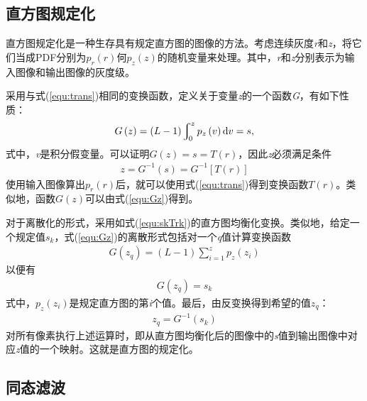 \documentclass{hitreport}
\begin{document}
\subsection{直方图规定化}\label{sec:guidinghua}

直方图规定化是一种生存具有规定直方图的图像的方法。考虑连续灰度\textit{r}和\textit{z}，将它们当成PDF分别为$p_r\left(r\right)$何$p_z\left(z\right)$的随机变量来处理。其中，\textit{r}和\textit{z}分别表示为输入图像和输出图像的灰度级。

采用与式(\ref{equ:trans})相同的变换函数，定义关于变量\textit{z}的一个函数\textit{G}，有如下性质：
\begin{align}\label{equ:Gz}
G\left(z\right) = \left(L-1\right)\varint\nolimits_{0}^{z}p_z\left(v\right)\mathrm{d}v = s,
\end{align}
式中，\textit{v}是积分假变量。可以证明$G\left(z\right) = s = T\left(r\right)$，因此\textit{z}必须满足条件
\begin{align}
z = G^{-1}\left(s\right) = G^{-1}\left[T\left(r\right)\right]
\end{align}
使用输入图像算出$p_r\left(r\right)$后，就可以使用式(\ref{equ:trans})得到变换函数$T\left(r\right)$。类似地，函数$G\left(z\right)$可以由式(\ref{equ:Gz})得到。

对于离散化的形式，采用如式(\ref{equ:skTrk})的直方图均衡化变换。类似地，给定一个规定值$s_k$，式(\ref{equ:Gz})的离散形式包括对一个\textit{q}值计算变换函数
\begin{align}
G\left(z_q\right) = \left(L-1\right)\sum_{i=1}^{z}p_z\left(z_i\right)
\end{align}
以便有
\begin{align}
G\left(z_q\right) = s_k
\end{align}
式中，$p_z\left(z_i\right)$是规定直方图的第\textit{i}个值。最后，由反变换得到希望的值$z_q$：
\begin{align}
z_q = G^{-1}\left(s_k\right)
\end{align}
对所有像素执行上述运算时，即从直方图均衡化后的图像中的\textit{s}值到输出图像中对应\textit{z}值的一个映射。这就是直方图的规定化。

\subsection{同态滤波}\label{sec:tongtai}
\end{document}
